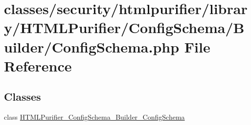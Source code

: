 \hypertarget{ConfigSchema_2Builder_2ConfigSchema_8php}{\section{classes/security/htmlpurifier/library/\+H\+T\+M\+L\+Purifier/\+Config\+Schema/\+Builder/\+Config\+Schema.php File Reference}
\label{ConfigSchema_2Builder_2ConfigSchema_8php}
}
\subsection*{Classes}
\begin{DoxyCompactItemize}
\item 
class \hyperlink{classHTMLPurifier__ConfigSchema__Builder__ConfigSchema}{H\+T\+M\+L\+Purifier\+\_\+\+Config\+Schema\+\_\+\+Builder\+\_\+\+Config\+Schema}
\end{DoxyCompactItemize}
